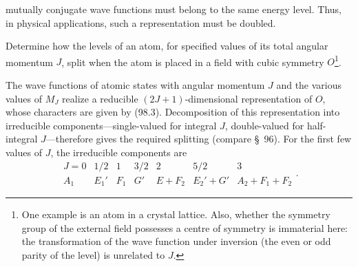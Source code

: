 mutually conjugate wave functions must belong to the same energy level. Thus, in physical applications, such a representation must be doubled.





\ProblemHeading

Determine how the levels of an atom, for specified values of its total angular momentum $J$, split when the atom is placed in a field with cubic symmetry $O$\footnote{One example is an atom in a crystal lattice. Also, whether the symmetry group of the external field possesses a centre of symmetry is immaterial here: the transformation of the wave function under inversion (the even or odd parity of the level) is unrelated to $J$.}.

\SolutionHeading The wave functions of atomic states with angular momentum $J$ and the various values of $M_J$ realize a reducible $(2J+1)$-dimensional representation of $O$, whose characters are given by (98.3). Decomposition of this representation into irreducible components---single-valued for integral $J$, double-valued for half-integral $J$---therefore gives the required splitting (compare \S~96). For the first few values of $J$, the irreducible components are
\[
\begin{array}{c|c|c|c|c|c|c|c}
J=0&1/2&1&3/2&2&5/2&3\\ \hline
A_1&E_1'&F_1&G'&E+F_2&E_2'+G'&A_2+F_1+F_2
\end{array}.
\]

